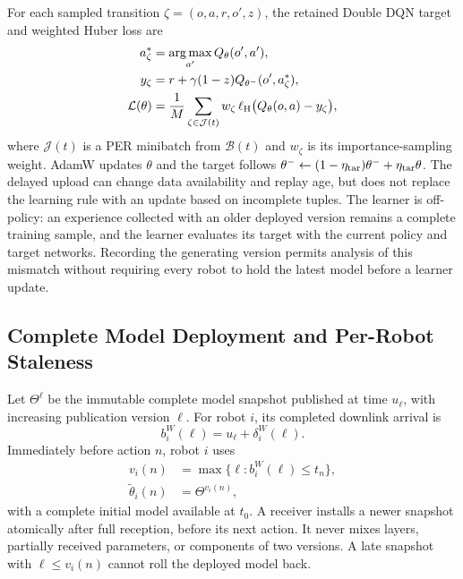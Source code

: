 \begin{panamaaddition}
For each sampled transition $\zeta=(o,a,r,o',z)$, the retained Double DQN
target and weighted Huber loss are
\begin{align}
 a_\zeta^*&=\operatorname*{arg\,max}_{a'}Q_\theta(o',a'),\\
 y_\zeta&=r+\gamma(1-z)Q_{\theta^-}(o',a_\zeta^*),\\
 \mathcal{L}(\theta)&=\frac{1}{M}
       \sum_{\zeta\in\mathcal{J}(t)}
       w_\zeta\,\ell_{\rm H}\big(Q_\theta(o,a)-y_\zeta\big),
 \label{eq:panama-loss}
\end{align}
where $\mathcal{J}(t)$ is a PER minibatch from $\mathcal{B}(t)$ and
$w_\zeta$ is its importance-sampling weight. AdamW updates $\theta$ and the
target follows
$\theta^-\leftarrow(1-\eta_{\rm tar})\theta^-+\eta_{\rm tar}\theta$.
The delayed upload can change data availability and replay age, but does not
replace the learning rule with an update based on incomplete tuples.
The learner is off-policy: an experience collected with an older deployed
version remains a complete training sample, and the learner evaluates its
target with the current policy and target networks. Recording the generating
version permits analysis of this mismatch without requiring every robot to
hold the latest model before a learner update.

\subsection{Complete Model Deployment and Per-Robot Staleness}
Let $\Theta^\ell$ be the immutable complete model snapshot published at time
$u_\ell$, with increasing publication version $\ell$. For robot $i$, its
completed downlink arrival is
\begin{equation}
 b_i^W(\ell)=u_\ell+\delta_i^W(\ell).
 \label{eq:panama-download}
\end{equation}
Immediately before action $n$, robot $i$ uses
\begin{align}
 v_i(n)&=\max\{\ell:b_i^W(\ell)\leq t_n\},\\
 \widetilde{\theta}_i(n)&=\Theta^{v_i(n)},
 \label{eq:panama-deployed}
\end{align}
with a complete initial model available at $t_0$. A receiver installs a newer
snapshot atomically after full reception, before its next action. It never
mixes layers, partially received parameters, or components of two versions.
A late snapshot with $\ell\leq v_i(n)$ cannot roll the deployed model back.


\end{panamaaddition}
